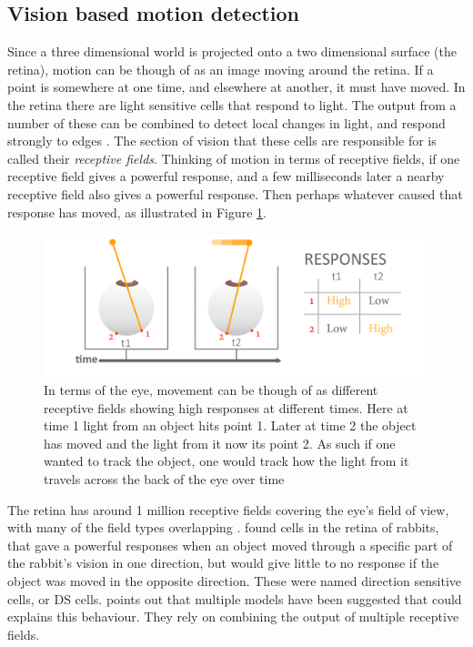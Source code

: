 \documentclass[11pt,a4paper,oneside,table,xcdraw]{article}
\begin{document}
\subsection{Vision based motion detection}
Since a three dimensional world is projected onto a two dimensional surface (the retina), motion can be though of as an image moving around the retina. If a point is somewhere at one time, and elsewhere at another, it must have moved. In the retina there are light sensitive cells that respond to light. The output from a number of these can be combined to detect local changes in light, and respond strongly to edges \cite[p. 53]{coursebook}. The section of vision that these cells are responsible for is called their \textit{receptive fields}. Thinking of motion in terms of receptive fields, if one receptive field gives a powerful response, and a few milliseconds later a nearby receptive field also gives a powerful response. Then perhaps whatever caused that response has moved, as illustrated in Figure \ref{fig:overtime}.
\begin{figure}[H]
		\centering
		\includegraphics[width=1\linewidth]{figure/overtime.png}
		\caption{In terms of the eye, movement can be though of as different receptive fields showing high responses at different times. Here at time 1 light from an object hits point 1. Later at time 2 the object has moved and the light from it now its point 2. As such if one wanted to track the object, one would track how the light from it travels across the back of the eye over time}
		\label{fig:overtime}
\end{figure}
The retina has around 1 million receptive fields covering the eye's field of view, with many of the field types overlapping  \cite[p. 64-65]{coursebook}. \cite{Barlow1965} found cells in the retina of rabbits, that gave a powerful responses when an object moved through a specific part of the rabbit's vision in one direction, but would give little to no response if the object was moved in the opposite direction. These were named direction sensitive cells, or DS cells. \citet{review} points out that multiple models have been suggested that could explains this behaviour. They rely on combining the output of multiple receptive fields.\\\\
\end{document}
